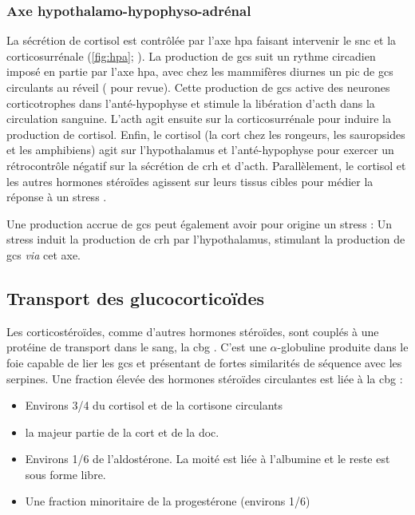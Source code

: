 \documentclass[../main.tex]{subfiles}
\begin{document}
\subsubsection[Axe hypothalamo-hypophyso-adrénal]{Axe hypothalamo-hypophyso-adrénal}
La sécrétion de cortisol est contrôlée par l'axe \gls{hpa} faisant intervenir le \gls{snc} et la corticosurrénale (\autoref{fig:hpa}; \citealp{Herman1997}).
La production de \glspl{gc} suit un rythme circadien imposé en partie par l'axe \gls{hpa}, avec chez les mammifères diurnes un pic de \glspl{gc} circulants au réveil (\citealp{Dickmeis2009} pour revue).
Cette production de \glspl{gc} active des neurones corticotrophes dans l'anté-hypophyse et stimule la libération d'\gls{acth} dans la circulation sanguine.
L'\gls{acth} agit ensuite sur la corticosurrénale pour induire la production de cortisol.
Enfin, le cortisol (la \gls{cort} chez les rongeurs, les sauropsides et les amphibiens) agit sur l'hypothalamus et l'anté-hypophyse pour exercer un rétrocontrôle négatif sur la sécrétion de \gls{crh} et d'\gls{acth}.
Parallèlement, le cortisol et les autres hormones stéroïdes agissent sur leurs tissus cibles pour médier la réponse à un stress \citep{Herman1997,Tsigos2002}.
\par
Une production accrue de \glspl{gc} peut également avoir pour origine un stress :
Un stress induit la production de \gls{crh} par l'hypothalamus, stimulant la production de \glspl{gc} \textit{via} cet axe.




\subsection{Transport des glucocorticoïdes}
Les corticostéroïdes, comme d'autres hormones stéroïdes, sont couplés à une protéine de transport dans le sang, la \gls{cbg} \citep{Rosner1990}.
C'est une $\alpha$-globuline produite dans le foie capable de lier les \glspl{gc} et présentant de fortes similarités de séquence avec les serpines.
Une fraction élevée des hormones stéroïdes circulantes est liée à la \gls{cbg} \citep{Bittar1997,Becker2001}:
\begin{itemize}
\item Environs 3/4 du cortisol et de la cortisone circulants
\item la majeur partie de la \gls{cort} et de la \gls{doc}.
\item Environs 1/6 de l'aldostérone. La moité est liée à l'albumine et le reste est sous forme libre.
\item Une fraction minoritaire de la progestérone (environs 1/6)
\end{itemize}
\end{document}
